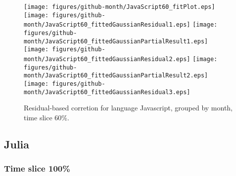 \begin{figure}[hb]
\centering
{}
{\texttt{[image: figures/github-month/JavaScript60\_fitPlot.eps]}}
{\texttt{[image: figures/github-month/JavaScript60\_fittedGaussianResidual1.eps]}}
{\texttt{[image: figures/github-month/JavaScript60\_fittedGaussianPartialResult1.eps]}}
{\texttt{[image: figures/github-month/JavaScript60\_fittedGaussianResidual2.eps]}}
{\texttt{[image: figures/github-month/JavaScript60\_fittedGaussianPartialResult2.eps]}}
{\texttt{[image: figures/github-month/JavaScript60\_fittedGaussianResidual3.eps]}}
\caption{Residual-based corretion for language Javascript, grouped by month, time slice 60\%.}
\end{figure}


\clearpage 
\newpage 


\subsection{Julia}

\FloatBarrier

\subsubsection{Time slice 100\%}


